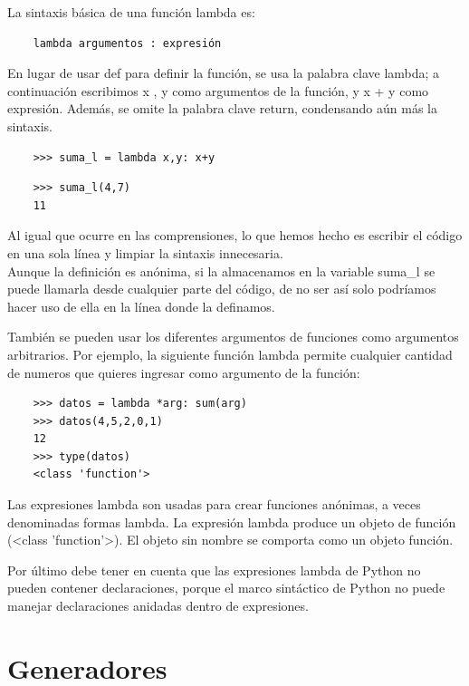 La sintaxis básica de una función lambda es:
\begin{lstlisting} 
	lambda argumentos : expresión
\end{lstlisting}
En lugar de usar {\ttfamily def} para definir la función, se usa la palabra  clave lambda; a continuación escribimos
{ \ttfamily x }, {\ttfamily y } como argumentos de la función, y {\ttfamily x + y} como expresión. Además, se omite la palabra clave {\ttfamily return}, condensando aún más la sintaxis.

\begin{lstlisting}
	>>> suma_l = lambda x,y: x+y
\end{lstlisting}

\begin{lstlisting}
	>>> suma_l(4,7)
	11
\end{lstlisting}

Al igual que ocurre en las comprensiones, lo que hemos hecho es escribir el código en una sola línea y limpiar la sintaxis innecesaria.\\

Aunque la definición es anónima, si la almacenamos en la variable {\ttfamily suma\_l} se puede llamarla desde cualquier parte del código, de no ser así solo podríamos hacer uso de ella en la línea donde la definamos.

También se pueden usar los diferentes argumentos de funciones como argumentos arbitrarios. Por ejemplo, la siguiente función lambda permite cualquier cantidad de numeros que quieres ingresar como argumento de la función: 

\begin{lstlisting}
	>>> datos = lambda *arg: sum(arg)
	>>> datos(4,5,2,0,1)
	12
	>>> type(datos)
	<class 'function'>
\end{lstlisting}

Las expresiones lambda son usadas para crear funciones anónimas, a veces denominadas formas lambda. La expresión lambda produce un objeto de función ({\ttfamily <{}class {}'{}function{}'{}>{}}). El objeto sin nombre se comporta como un objeto función.

Por último debe tener en cuenta que las expresiones lambda de Python no pueden contener declaraciones, porque el marco sintáctico de Python no puede manejar declaraciones anidadas dentro de expresiones.


\section{Generadores}\label{generadorF}

